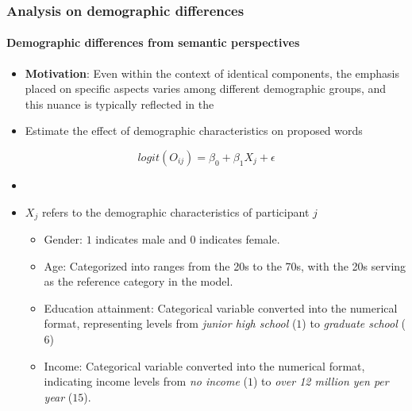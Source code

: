 \documentclass[
	aspectratio=169, %
	t, %
	onlytextwidth, %
	10pt, %
]{beamer}
\begin{document}
\begin{frame}
    \frametitle{Analysis on demographic differences}
    \framesubtitle{Demographic differences from semantic perspectives}
    \begin{itemize}
        \item \textbf{Motivation}: Even within the context of identical components, the emphasis placed on specific aspects varies among different demographic groups, and this nuance is typically reflected in the 
        
        \item Estimate the effect of demographic characteristics on proposed words
    \end{itemize}
    
    $$
        logit(O_{ij}) = \beta_{0}+\beta_{1}X_{j}+\epsilon
    $$
    
    \vspace{-1.5\baselineskip}
    \begin{itemize}
        \item {}
        \item $X_{j}$ refers to the demographic characteristics of participant $j$
        \begin{itemize}
            \item Gender: $1$ indicates male and $0$ indicates female.
            \item Age: Categorized into ranges from the 20s to the 70s, with the 20s serving as the reference category in the model. 
            \item Education attainment: Categorical variable converted into the numerical format, representing levels from \textit{junior high school} ($1$) to \textit{graduate school} ($6$)
            \item Income: Categorical variable converted into the numerical format, indicating income levels from \textit{no income} ($1$) to \textit{over 12 million yen per year} ($15$).
        \end{itemize}
    \end{itemize}
    
\end{frame}
\end{document}
